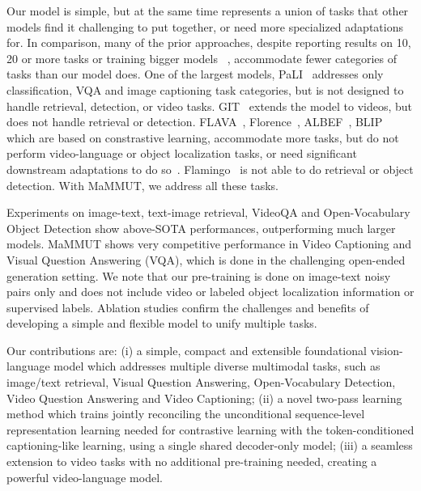 \documentclass[10pt]{article} \usepackage[accepted]{tmlr}
\newcommand{\ours}{MaMMUT\xspace}
\begin{document}
Our model is simple, but at the same time represents a union of tasks that other models find it challenging to put together, or need more specialized adaptations for. 
In comparison, many of the prior approaches, despite reporting results on 10, 20 or more tasks or training bigger models ~\citep{pali,singh2022flava,flamingo,yuan2021florence}, accommodate fewer categories of tasks than our model does. One of the largest models, PaLI~\citep{pali} addresses only classification, VQA and image captioning task categories, but is not designed to handle retrieval, detection, or video tasks. 
 GIT~\citep{wang2022git} extends the model to videos, but does not handle retrieval or detection.
FLAVA~\citep{singh2022flava}, Florence~\citep{yuan2021florence}, ALBEF~\citep{albef}, BLIP~\citep{li2022blip} which are based on constrastive learning,  accommodate more tasks, but do not perform video-language or object localization tasks, or need significant downstream adaptations to do so~\citep{yuan2021florence}.
Flamingo~\citep{flamingo} is not able to do retrieval or object detection.
With \ours, we address all these tasks.

Experiments on image-text, text-image retrieval, VideoQA and Open-Vocabulary Object Detection show above-SOTA performances, outperforming much larger models. \ours shows very competitive performance in Video Captioning and Visual Question Answering (VQA), which is done in the challenging open-ended generation setting. We note that our pre-training is done on image-text noisy pairs only and does not include video or labeled object localization information or supervised labels. Ablation studies confirm the challenges and benefits of developing a simple and flexible model to unify multiple tasks.

Our contributions are: 
(i) a simple, compact and extensible foundational vision-language model which addresses multiple diverse multimodal tasks, such as image/text retrieval, Visual Question Answering, Open-Vocabulary Detection, Video Question Answering and Video Captioning;
(ii) a novel two-pass learning method which trains jointly reconciling the unconditional sequence-level representation learning needed for contrastive learning with the token-conditioned captioning-like learning, using a single shared decoder-only model;
(iii) a seamless extension to video tasks with no additional pre-training needed, creating a powerful video-language model.






\vspace{-2mm}
\end{document}

